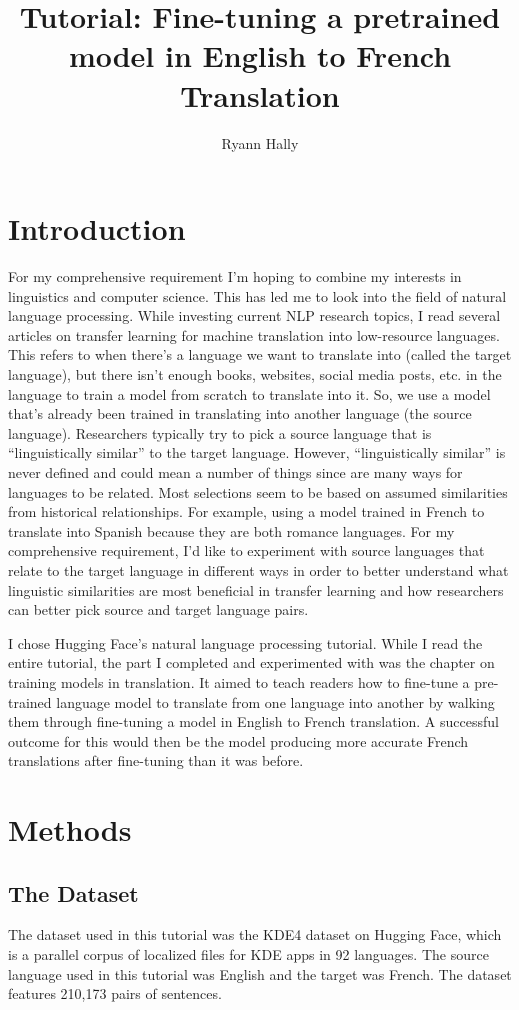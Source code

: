 \documentclass[10pt,twocolumn]{article}
\title{Tutorial: Fine-tuning a pretrained model in English to French Translation}
\author{Ryann Hally}
\affiliation{Occidental College}
\begin{document}
\maketitle
\section{Introduction}
For my comprehensive requirement I’m hoping to combine my interests in linguistics and computer science. This has led me to look into the field of natural language processing. While investing current NLP research topics, I read several articles on transfer learning for machine translation into low-resource languages. This refers to when there's a language we want to translate into (called the target language), but there isn't enough books, websites, social media posts, etc. in the language to train a model from scratch to translate into it. So, we use a model that's already been trained in translating into another language (the source language). Researchers typically try to pick a source language that is “linguistically similar” to the target language. However, “linguistically similar” is never defined and could mean a number of things since are many ways for languages to be related. Most selections seem to be based on assumed similarities from historical relationships. For example, using a model trained in French to translate into Spanish because they are both romance languages. For my comprehensive requirement, I'd like to experiment with source languages that relate to the target language in different ways in order to better understand what linguistic similarities are most beneficial in transfer learning and how researchers can better pick source and target language pairs.

I chose Hugging Face’s natural language processing tutorial. While I read the entire tutorial, the part I completed and experimented with was the chapter on training models in translation. It aimed to teach readers how to fine-tune a pre-trained language model to translate from one language into another by walking them through fine-tuning a model in English to French translation. A successful outcome for this would then be the model producing more accurate French translations after fine-tuning than it was before.


\section{Methods}

\subsection{The Dataset}
The dataset used in this tutorial was the KDE4 dataset on Hugging Face, which is a parallel corpus of  localized files for KDE apps in 92 languages. The source language used in this tutorial was English and the target was French. The dataset features 210,173 pairs of sentences.
\end{document}
